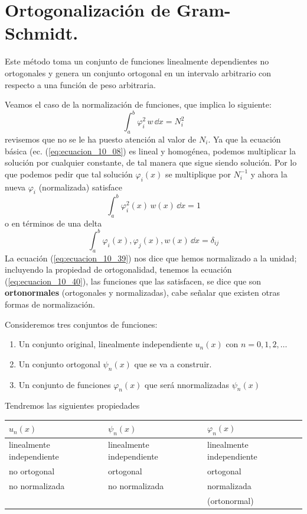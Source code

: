 \section{Ortogonalización de Gram-Schmidt.}
Este método toma un conjunto de funciones linealmente dependientes no ortogonales y genera un conjunto ortogonal en un intervalo arbitrario con respecto a una función de peso arbitraria.
\par
Veamos el caso de la normalización de funciones, que implica lo siguiente:
\[ \int_{a}^{b} \varphi_{i}^{2} \, w \, \dd x  =  N_{i}^{2} \]
revisemos que no se le ha puesto atención al valor de $N_{i}$. Ya que la ecuación básica (ec. (\ref{eq:ecuacion_10_08}) es lineal y homogénea, podemos multiplicar la solución por cualquier constante, de tal manera que sigue siendo solución. Por lo que podemos pedir que tal solución $\varphi_{i}(x)$ se multiplique por $N_{i}^{-1}$ y ahora la nueva $\varphi_{i}$ (normalizada) satisface
\begin{equation}
\int_{a}^{b} \varphi_{i}^{2} (x) \, w(x) \, \dd x = 1
\label{eq:ecuacion_10_39}
\end{equation}
o en términos de una delta
\begin{equation}
\int_{a}^{b} \varphi_{i}(x) , \varphi_{j} (x) , w(x) \, \dd x = \delta_{ij}
\label{eq:ecuacion_10_40}
\end{equation}
La ecuación (\ref{eq:ecuacion_10_39}) nos dice que hemos normalizado a la unidad; incluyendo la propiedad de ortogonalidad, tenemos la ecuación (\ref{eq:ecuacion_10_40}), las funciones que las satisfacen, se dice que son \textbf{ortonormales} (ortogonales y normalizadas), cabe señalar que existen otras formas de normalización.
\par
Consideremos tres conjuntos de funciones:
\begin{enumerate}
\item Un conjunto original, linealmente independiente $u_{n}(x)$ con $n=0,1,2,\ldots$
\item Un conjunto ortogonal $\psi_{n}(x)$ que se va a construir.
\item Un conjunto de funciones $\varphi_{n}(x)$ que será nnormalizadas $\psi_{n}(x)$
\end{enumerate}
Tendremos las siguientes propiedades
\begin{center}
{\fontsize{12}{12}\selectfont
\begin{tabular}{l l l}
    
\hline
$u_{n}(x)$ & $\psi_{n}(x)$ & $\varphi_{n}(x)$ \\ \hline
linealmente independiente &    linealmente independiente & linealmente independiente \\
no ortogonal & ortogonal & ortogonal \\
no  normalizada & no normalizada & normalizada \\
 & & (ortonormal)
\end{tabular}
}
\end{center}

